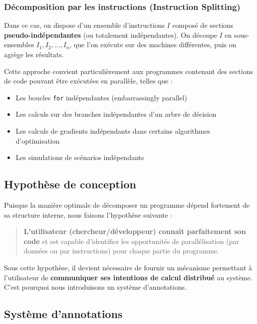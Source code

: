 \documentclass[12pt,a4paper]{report}
\theoremstyle{definition}
\begin{document}
\subsubsection{Décomposition par les instructions (Instruction Splitting)}

Dans ce cas, on dispose d'un ensemble d'instructions \( I \) composé de sections \textbf{pseudo-indépendantes} (ou totalement indépendantes). On découpe \( I \) en sous-ensembles \( I_1, I_2, \dots, I_n \), que l'on exécute sur des machines différentes, puis on agrège les résultats.

Cette approche convient particulièrement aux programmes contenant des sections de code pouvant être exécutées en parallèle, telles que :
\begin{itemize}
    \item[$\bullet$] Les boucles \texttt{for} indépendantes (embarrassingly parallel)
    \item[$\bullet$] Les calculs sur des branches indépendantes d'un arbre de décision
    \item[$\bullet$] Les calculs de gradients indépendants dans certains algorithmes d'optimisation
    \item[$\bullet$] Les simulations de scénarios indépendants
\end{itemize}

\subsection{Hypothèse de conception}

Puisque la manière optimale de décomposer un programme dépend fortement de sa structure interne, nous faisons l'hypothèse suivante :

\begin{quote}
\textbf{L'utilisateur (chercheur/développeur) connaît parfaitement son code} et est capable d'identifier les opportunités de parallélisation (par données ou par instructions) pour chaque partie du programme.
\end{quote}

Sous cette hypothèse, il devient nécessaire de fournir un mécanisme permettant à l'utilisateur de \textbf{communiquer ses intentions de calcul distribué} au système. C'est pourquoi nous introduisons un système d'annotations.
\subsection{Système d'annotations}
\end{document}
